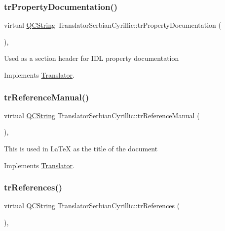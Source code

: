 \subsubsection{\texorpdfstring{trPropertyDocumentation()}{trPropertyDocumentation()}}
{\footnotesize\ttfamily virtual \mbox{\hyperlink{class_q_c_string}{Q\+C\+String}} Translator\+Serbian\+Cyrillic\+::tr\+Property\+Documentation (\begin{DoxyParamCaption}{ }\end{DoxyParamCaption})\hspace{0.3cm}{\ttfamily [inline]}, {\ttfamily [virtual]}}

Used as a section header for I\+DL property documentation 

Implements \mbox{\hyperlink{class_translator}{Translator}}.

\mbox{\label{class_translator_serbian_cyrillic_a0a5a8d376effc003a2bf6e943773af29}} 
\subsubsection{\texorpdfstring{trReferenceManual()}{trReferenceManual()}}
{\footnotesize\ttfamily virtual \mbox{\hyperlink{class_q_c_string}{Q\+C\+String}} Translator\+Serbian\+Cyrillic\+::tr\+Reference\+Manual (\begin{DoxyParamCaption}{ }\end{DoxyParamCaption})\hspace{0.3cm}{\ttfamily [inline]}, {\ttfamily [virtual]}}

This is used in La\+TeX as the title of the document 

Implements \mbox{\hyperlink{class_translator}{Translator}}.

\mbox{\label{class_translator_serbian_cyrillic_af031ca3bda559092a82830b048761fc4}} 
\subsubsection{\texorpdfstring{trReferences()}{trReferences()}}
{\footnotesize\ttfamily virtual \mbox{\hyperlink{class_q_c_string}{Q\+C\+String}} Translator\+Serbian\+Cyrillic\+::tr\+References (\begin{DoxyParamCaption}{ }\end{DoxyParamCaption})\hspace{0.3cm}{\ttfamily [inline]}, {\ttfamily [virtual]}}

